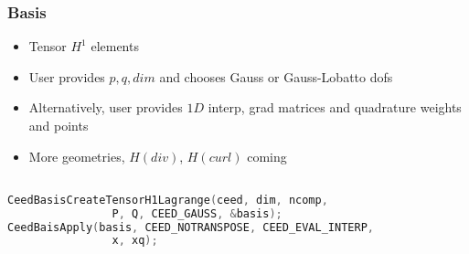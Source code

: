 \documentclass{beamer}
\begin{document}
\begin{frame}[fragile]
\begin{center}
\frametitle{Basis}

\begin{itemize}

\item Tensor $H^1$ elements\\

\item User provides $p, q, dim$ and chooses Gauss or Gauss-Lobatto dofs\\

\item Alternatively, user provides $1D$ interp, grad matrices and quadrature weights and points\\

\item More geometries, $H(div)$, $H(curl)$ coming\\

\end{itemize}

{\small
\begin{lstlisting}[language=C]

CeedBasisCreateTensorH1Lagrange(ceed, dim, ncomp,
                P, Q, CEED_GAUSS, &basis);
CeedBaisApply(basis, CEED_NOTRANSPOSE, CEED_EVAL_INTERP,
                x, xq);

\end{lstlisting}
}

\end{center}
\end{frame}

\end{document}
